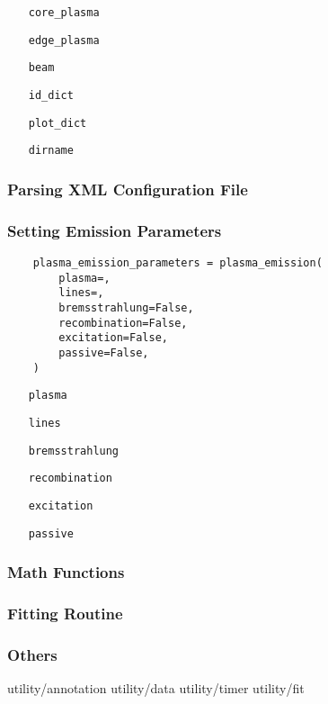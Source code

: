\documentclass[../main.tex]{subfiles}
\begin{document}
\begin{itemize}[align=left]
    \item[\texttt{core\_plasma}]
    \item[\texttt{edge\_plasma}]
    \item[\texttt{beam}]
    \item[\texttt{id\_dict}]
    \item[\texttt{plot\_dict}]
    \item[\texttt{dirname}]
\end{itemize}

\subsubsection{Parsing XML Configuration File}%
\label{sec:xml}


\subsubsection{Setting Emission Parameters}%
\label{sec:emission}

\begin{verbatim}
    plasma_emission_parameters = plasma_emission(
        plasma=,
        lines=,
        bremsstrahlung=False,
        recombination=False,
        excitation=False,
        passive=False,
    )
\end{verbatim}

\begin{itemize}[align=left]
    \item[\texttt{plasma}]
    \item[\texttt{lines}]
    \item[\texttt{bremsstrahlung}]
    \item[\texttt{recombination}]
    \item[\texttt{excitation}]
    \item[\texttt{passive}]
\end{itemize}

\subsubsection{Math Functions}%
\label{sec:math}

\subsubsection{Fitting Routine}%
\label{sec:fitting}

\subsubsection{Others}%
\label{sec:other}

utility/annotation
utility/data
utility/timer
utility/fit
\end{document}
